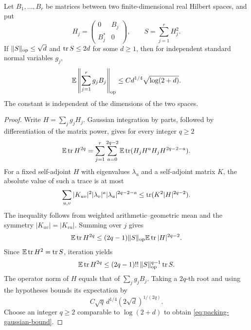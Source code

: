 \begin{lemma}\label{lem:packing-gaussian}
Let $B_1,\ldots,B_r$ be matrices between two finite-dimensional real
Hilbert spaces, and put
\[
 H_j=\begin{pmatrix}0&B_j\\B_j^*&0\end{pmatrix},
 \qquad S=\sum_{j=1}^rH_j^2.
\]
If $\lVert S\rVert_{\rm op}\le\sqrt d$ and $\operatorname{tr} S\le2d$ for some
$d\ge1$, then for independent standard normal variables $g_j$,
\begin{equation}\label{eq:packing-gaussian-bound}
 \mathbb E\left\|\sum_{j=1}^rg_jB_j\right\|_{\rm op}
       \le C d^{1/4}\sqrt{\log(2+d)}.
\end{equation}
The constant is independent of the dimensions of the two spaces.
\end{lemma}

\begin{proof}
Write $H=\sum_jg_jH_j$.  Gaussian integration by parts, followed by
differentiation of the matrix power, gives for every integer $q\ge2$
\[
 \mathbb E\operatorname{tr} H^{2q}
 =\sum_{j=1}^r\sum_{a=0}^{2q-2}
      \mathbb E\operatorname{tr}(H_jH^aH_jH^{2q-2-a}).
\]
For a fixed self-adjoint $H$ with eigenvalues $\lambda_u$ and a
self-adjoint matrix $K$, the absolute value of such a trace is at most
\[
 \sum_{u,v}|K_{uv}|^2
       |\lambda_v|^a|\lambda_u|^{2q-2-a}
 \le\operatorname{tr}(K^2|H|^{2q-2}).
\]
The inequality follows from weighted arithmetic--geometric mean and
the symmetry $|K_{uv}|=|K_{vu}|$.  Summing over $j$ gives
\begin{equation}\label{eq:packing-moment-recursion}
 \mathbb E\operatorname{tr} H^{2q}
 \le(2q-1)\lVert S\rVert_{\rm op}\mathbb E\operatorname{tr}|H|^{2q-2}.
\end{equation}
Since $\mathbb E\operatorname{tr} H^2=\operatorname{tr} S$, iteration yields
\[
 \mathbb E\operatorname{tr} H^{2q}
 \le(2q-1)!!\,\lVert S\rVert_{\rm op}^{q-1}\operatorname{tr} S.
\]
The operator norm of $H$ equals that of $\sum_jg_jB_j$.
Taking a $2q$-th root and using the hypotheses bounds its expectation by
\[
 C\sqrt q\,d^{1/4}(2\sqrt d)^{1/(2q)}.
\]
Choose an integer $q\ge2$ comparable to $\log(2+d)$ to obtain
\eqref{eq:packing-gaussian-bound}.
\end{proof}

